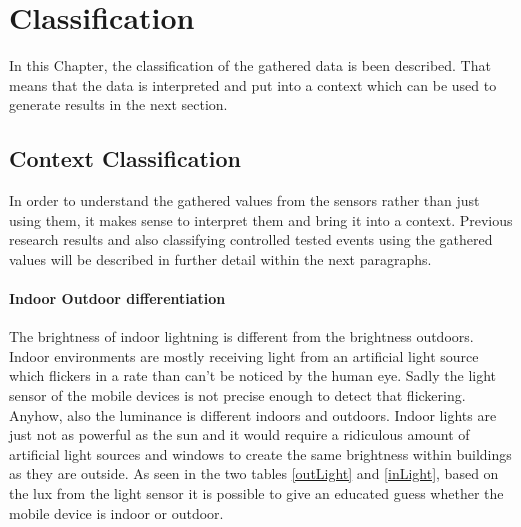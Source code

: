 \chapter{Classification}
In this Chapter, the classification of the gathered data is been described. That means that the data is interpreted and put into a context which can be used to generate results in the next section.

\section{Context Classification}
In order to understand the gathered values from the sensors rather than just using them, it makes sense to interpret them and bring it into a context. Previous research results and also classifying controlled tested events using the gathered values will be described in further detail within the next paragraphs.

\subsubsection{Indoor Outdoor differentiation}
The brightness of indoor lightning is different from the brightness outdoors. Indoor environments are mostly receiving light from an artificial light source which flickers in a rate than can't be noticed by the human eye. Sadly the light sensor of the mobile devices is not precise enough to detect that flickering. Anyhow, also the luminance is different indoors and outdoors. Indoor lights are just not as powerful as the sun and it would require a ridiculous amount of artificial light sources and windows to create the same brightness within buildings as they are outside. 
As seen in the two tables \ref{outLight} and \ref{inLight}, based on the lux from the light sensor it is possible to give an educated guess whether the mobile device is indoor or outdoor.

